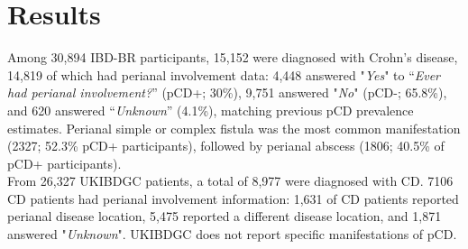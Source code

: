 


\section{Results}
Among 30,894 IBD-BR participants, 15,152 were diagnosed with Crohn's disease, 14,819 of which had perianal involvement data: 4,448 answered "\textit{Yes}" to “\textit{Ever had perianal involvement?}” (pCD+; 30\%), 9,751 answered "\textit{No}" (pCD-; 65.8\%), and 620 answered “\textit{Unknown}” (4.1\%), matching previous pCD prevalence estimates. Perianal simple or complex fistula was the most common manifestation (2327;  52.3\% pCD+ participants), followed by perianal abscess (1806; 40.5\% of pCD+ participants).\\

From 26,327 UKIBDGC patients, a total of 8,977 were diagnosed with CD. 7106 CD patients had perianal involvement information: 1,631 of CD patients reported perianal disease location, 5,475 reported a different disease location, and 1,871 answered "\textit{Unknown}". UKIBDGC does not report specific manifestations of pCD.

